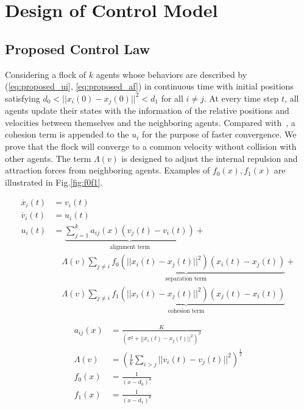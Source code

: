 \chapter{Design of Control Model}\label{design}

\section{Proposed Control Law}

Considering a flock of $k$ agents whose behaviors are described by (\ref{eq:proposed_ui}, \ref{eq:proposed_af}) in continuous time with initial positions satisfying $d_0<||x_i(0)-x_j(0)||^2<d_1$ for all $i\neq j$. At every time step $t$, all agents update their states with the information of the relative positions and velocities between themselves and the neighboring agents. Compared with~\cite{CuckerDong2010}, a cohesion term is appended to the $u_i$ for the purpose of faster convergence. We prove that the flock will converge to a common velocity without collision with other agents. The term $\Lambda(v)$ is designed to adjust the internal repulsion and attraction forces from neighboring agents. Examples of $f_0(x), f_1(x)$ are illustrated in Fig.\ref{fig:f0f1}.

\begin{equation}\label{eq:proposed_ui}
\begin{aligned}
\dot{x_i}(t)&=v_i(t)\\
\dot{v_i}(t)&=u_i(t)\\
u_i(t)&=\underbrace{\sum^k_{j=1}a_{ij}(x)(v_j(t)-v_i(t))}_{\text{alignment term}}+\\
&\quad\Lambda(v)\underbrace{\sum_{j\neq i}f_0(||x_i(t)-x_j(t)||^2)(x_i(t)-x_j(t))}_{\text{separation term}}+\\
&\quad\Lambda(v)\underbrace{\sum_{j\neq i}f_1(||x_i(t)-x_j(t)||^2)(x_j(t)-x_i(t))}_{\text{cohesion term}}
\end{aligned}
\end{equation}

\begin{equation}\label{eq:proposed_af}
\begin{aligned}
a_{ij}(x)&=\frac{K}{(\sigma^2+||x_i(t)-x_j(t)||^2)^{\beta}}\\
\Lambda(v)&=(\frac{1}{k}\sum_{i>j}||v_i(t)-v_j(t)||^2)^{\frac{1}{2}}\\
f_0(x)&=\frac{1}{(x-d_0)^{\theta}}\\
f_1(x)&=\frac{1}{(x-d_1)^{\theta}}
\end{aligned}
\end{equation}

